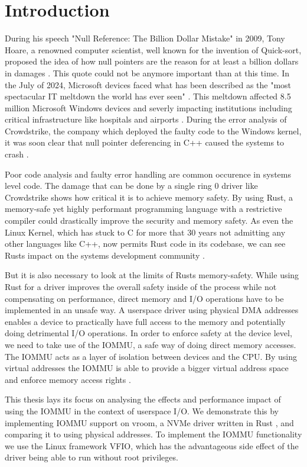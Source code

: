 \chapter{Introduction}\label{c:introduction}

During his speech "Null Reference: The Billion Dollar Mistake" in 2009, Tony Hoare, a renowned computer scientist, well known for the invention of Quick-sort, proposed the idea of how null pointers are the reason for at least a billion dollars in damages \cite{billiondollarmistake}. This quote could not be anymore important than at this time. In the July of 2024, Microsoft devices faced what has been described as the "most spectacular IT meltdown the world has ever seen" \cite{bloombergmeltdown}. This meltdown affected 8.5 million Microsoft Windows devices and severly impacting institutions including critical infrastructure like hospitals and airports \cite{bloomberg8milliondevices}. During the error analysis of Crowdstrike, the company which deployed the faulty code to the Windows kernel, it was soon clear that null pointer deferencing in C++ caused the systems to crash \cite{heisenullpointer}.

Poor code analysis and faulty error handling are common occurence in systems level code. The damage that can be done by a single ring 0 driver like Crowdstrike shows how critical it is to achieve memory safety. By using Rust, a memory-safe yet highly performant programming language with a restrictive compiler could drastically improve the security and memory safety. As even the Linux Kernel, which has stuck to C for more that 30 years not admitting any other languages like C++, now permits Rust code in its codebase, we can see Rusts impact on the systems development community \cite{linuxrustpull}.

But it is also necessary to look at the limits of Rusts memory-safety. While using Rust for a driver improves the overall safety inside of the process while not compensating on performance, direct memory and I/O operations have to be implemented in an unsafe way. A userspace driver using physical DMA addresses enables a device to practically have full access to the memory and potentially doing detrimental I/O operations.
In order to enforce safety at the device level, we need to take use of the IOMMU, a safe way of doing direct memory accesses. The IOMMU acts as a layer of isolation between devices and the CPU. By using virtual addresses the IOMMU is able to provide a bigger virtual address space and enforce memory access rights \cite{OLS2007}.

This thesis lays its focus on analysing the effects and performance impact of using the IOMMU in the context of userspace I/O.
We demonstrate this by implementing IOMMU support on vroom, a NVMe driver written in Rust \cite{vroom}, and comparing it to using physical addresses. To implement the IOMMU functionality we use the Linux framework VFIO, which has the advantageous side effect of the driver being able to run without root privileges.
